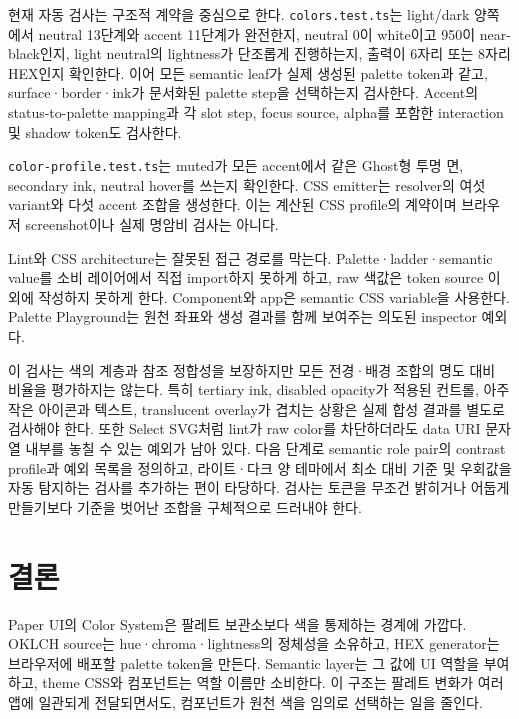 \documentclass[11pt,titlepage]{article}
\begin{document}
현재 자동 검사는 구조적 계약을 중심으로 한다. \texttt{colors.test.ts}는 light/dark 양쪽에서 neutral 13단계와 accent 11단계가 완전한지, neutral 0이 white이고 950이 near-black인지, light neutral의 lightness가 단조롭게 진행하는지, 출력이 6자리 또는 8자리 HEX인지 확인한다. 이어 모든 semantic leaf가 실제 생성된 palette token과 같고, surface·border·ink가 문서화된 palette step을 선택하는지 검사한다. Accent의 status-to-palette mapping과 각 slot step, focus source, alpha를 포함한 interaction 및 shadow token도 검사한다\cite{colortests}.

\texttt{color-profile.test.ts}는 muted가 모든 accent에서 같은 Ghost형 투명 면, secondary ink, neutral hover를 쓰는지 확인한다. CSS emitter는 resolver의 여섯 variant와 다섯 accent 조합을 생성한다. 이는 계산된 CSS profile의 계약이며 브라우저 screenshot이나 실제 명암비 검사는 아니다\cite{profiletests}.

Lint와 CSS architecture는 잘못된 접근 경로를 막는다. Palette·ladder·semantic value를 소비 레이어에서 직접 import하지 못하게 하고, raw 색값은 token source 이외에 작성하지 못하게 한다. Component와 app은 semantic CSS variable을 사용한다. Palette Playground는 원천 좌표와 생성 결과를 함께 보여주는 의도된 inspector 예외다\cite{architecture,tokensdoc}.

이 검사는 색의 계층과 참조 정합성을 보장하지만 모든 전경·배경 조합의 명도 대비 비율을 평가하지는 않는다. 특히 tertiary ink, disabled opacity가 적용된 컨트롤, 아주 작은 아이콘과 텍스트, translucent overlay가 겹치는 상황은 실제 합성 결과를 별도로 검사해야 한다. 또한 Select SVG처럼 lint가 raw color를 차단하더라도 data URI 문자열 내부를 놓칠 수 있는 예외가 남아 있다. 다음 단계로 semantic role pair의 contrast profile과 예외 목록을 정의하고, 라이트·다크 양 테마에서 최소 대비 기준 및 우회값을 자동 탐지하는 검사를 추가하는 편이 타당하다. 검사는 토큰을 무조건 밝히거나 어둡게 만들기보다 기준을 벗어난 조합을 구체적으로 드러내야 한다.

\section{결론}

Paper UI의 Color System은 팔레트 보관소보다 색을 통제하는 경계에 가깝다. OKLCH source는 hue·chroma·lightness의 정체성을 소유하고, HEX generator는 브라우저에 배포할 palette token을 만든다. Semantic layer는 그 값에 UI 역할을 부여하고, theme CSS와 컴포넌트는 역할 이름만 소비한다. 이 구조는 팔레트 변화가 여러 앱에 일관되게 전달되면서도, 컴포넌트가 원천 색을 임의로 선택하는 일을 줄인다.
\end{document}
